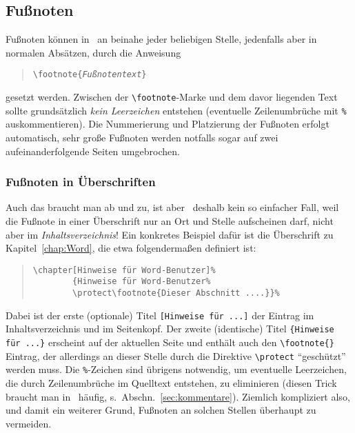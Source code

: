 \subsection{Fußnoten}
Fußnoten können in \latex\ an beinahe jeder beliebigen Stelle,
jedenfalls aber in normalen Absätzen, durch die Anweisung
%
\begin{quote}
\verb!\footnote{!\texttt{\em Fußnotentext}\verb!}!
\end{quote}
%
gesetzt werden. Zwischen der \verb!\footnote!-Marke und dem davor
liegenden Text sollte grundsätzlich \emph{kein Leerzeichen} entstehen (eventuelle
Zeilen\-um\-brüche mit \verb!%! auskommentieren).
Die Nummerierung und Platzierung der Fußnoten
erfolgt automatisch, sehr große Fußnoten werden notfalls sogar auf
zwei aufeinanderfolgende Seiten umgebrochen.


\subsubsection{Fußnoten in Überschriften}

Auch das braucht man ab und zu, ist aber \va\ deshalb kein so
einfacher Fall, weil die Fußnote in einer Überschrift nur an Ort
und Stelle aufscheinen darf, nicht aber im \emph{Inhaltsverzeichnis}! Ein
konkretes Beispiel dafür ist die Überschrift zu
Kapitel~\ref{chap:Word}, die etwa folgendermaßen definiert ist:
%
\begin{quote}
\begin{verbatim}
\chapter[Hinweise für Word-Benutzer]%
        {Hinweise für Word-Benutzer%
        \protect\footnote{Dieser Abschnitt ....}}%
\end{verbatim}
\end{quote}
%
Dabei ist der erste (optionale) Titel \verb![Hinweise für ...]!
der Eintrag im Inhaltsverzeichnis und im Seitenkopf. 
Der zweite (identische) Titel
\texttt{\{Hinweise für ...\}} erscheint auf der aktuellen Seite und
enthält auch den \verb!\footnote{}! Eintrag, der allerdings an
dieser Stelle durch die Direktive \verb!\protect! "`geschützt"'
werden muss. Die \verb!%!-Zeichen sind übrigens notwendig,
um eventuelle Leerzeichen, die durch Zeilenumbrüche im Quelltext
entstehen, zu eliminieren (diesen Trick braucht man %
in \latex\ häufig, s.\ Abschn.~\ref{sec:kommentare}). 
Ziemlich kompliziert also, und damit 
ein weiterer Grund, Fußnoten an solchen Stellen überhaupt zu vermeiden.

